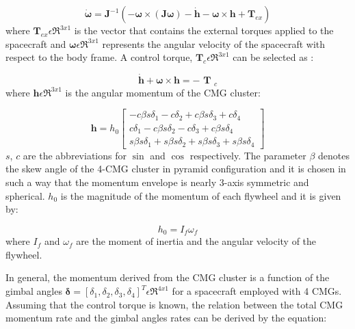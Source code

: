 \documentclass[aerospace,article,submit,moreauthors,dvi2pdf]{Definitions/mdpi}
\begin{document}
\begin{equation}
\dot{\boldsymbol{\omega}}=\textbf{J}^{-1}(-\boldsymbol{\omega}\times(\textbf{J}\boldsymbol{\omega})-\dot{\textbf{h}}-\boldsymbol{\omega}\times \textbf{h} + \textbf{T}_{ex})
\label{eq:dyn_eq}
\end{equation}
where $\textbf{T}_{ex} \epsilon { \Re  }^{ 3x1}$ is the vector that contains the external torques applied to the spacecraft and $\boldsymbol{\omega} \epsilon {\Re}^{3x1}$ represents the angular velocity of the spacecraft with respect to the body frame. A control torque, $\textbf{T}_c  \epsilon {\Re}^{3x1}$ can be selected as \cite{lappasthesis}:

\begin{equation}
\dot { \textbf{h} } +\boldsymbol{\omega}\times \textbf{h}=-\textbf{ T }_c
\label{eq:control}
\end{equation}
where $ \textbf{h}\epsilon\Re^{3x1}$ is the angular momentum of the CMG cluster:

\begin{equation}
\textbf{h}=h_0
\begin{bmatrix}
-c\beta s\delta_1-c\delta_2+c\beta s\delta_3+c\delta_4 \\
c\delta_1 -c\beta s\delta_2 -c\delta_3 +c\beta s\delta_4 \\
s\beta s\delta_1+s\beta s\delta_2+s\beta s\delta_3+s\beta s\delta_4
\end{bmatrix}  
\label{eq:momentum}
\end{equation}
$s$, $c$ are the abbreviations for $\sin$ and $\cos$ respectively.  The parameter $\beta$ denotes the skew angle of the 4-CMG cluster in pyramid configuration and it is chosen in such a way that the momentum envelope is nearly 3-axis symmetric and spherical. $h_0$ is the magnitude of the momentum of each flywheel and it is given by:

\begin{equation}
h_0=I_{f}\omega_{f}
\label{eq:h0flywheel}
\end{equation}
where $I_f$ and $\omega_f$ are the moment of inertia and the angular velocity of the flywheel.  

In general, the momentum derived from the CMG cluster is a function of the gimbal angles $\boldsymbol{\delta}=[\delta_1, \delta_2,\delta_3, \delta_4]^T\epsilon\Re^{4x1}$ for a spacecraft employed with 4 CMGs. Assuming that the control torque is known, the relation between the total CMG momentum rate and the gimbal angles rates  can be derived by the equation:
\end{document}
